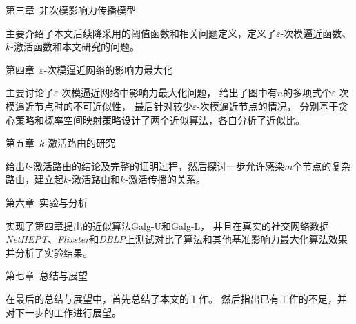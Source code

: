 第三章~非次模影响力传播模型

主要介绍了本文后续降采用的阈值函数和相关问题定义，定义了$\varepsilon$-次模逼近函数、$k$-激活函数和本文研究的问题。

第四章~$\varepsilon$-次模逼近网络的影响力最大化

主要讨论了$\varepsilon$-次模逼近网络中影响力最大化问题，
给出了图中有$n$的多项式个$\varepsilon$-次模逼近节点时的不可近似性，
最后针对较少$\varepsilon$-次模逼近节点的情况，
分别基于贪心策略和概率空间映射策略设计了两个近似算法，各自分析了近似比。


第五章~$k$-激活路由的研究

给出$k$-激活路由的结论及完整的证明过程，然后探讨一步允许感染$m$个节点的复杂路由，建立起$k$-激活路由和$k$-激活传播的关系。


第六章~实验与分析

实现了第四章提出的近似算法\textsf{Galg-U}和\textsf{Galg-L}，
并且在真实的社交网络数据{\em NetHEPT}、{\em Flixster}和{\em DBLP}上测试对比了算法和其他基准影响力最大化算法效果并分析了实验结果。

第七章~总结与展望

在最后的总结与展望中，首先总结了本文的工作。
然后指出已有工作的不足，并对下一步的工作进行展望。